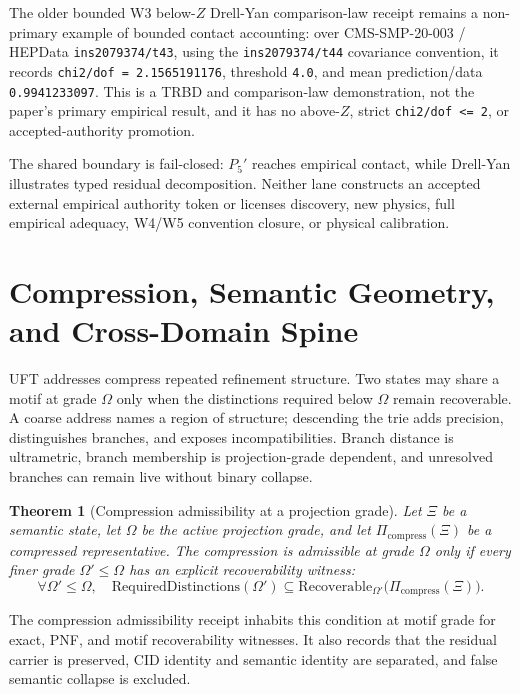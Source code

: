 \documentclass[11pt]{article}
\theoremstyle{definition}
\theoremstyle{plain}
\newtheorem{theorem}[definition]{Theorem}
\theoremstyle{remark}
\begin{document}
The older bounded W3 below-\(Z\) Drell-Yan comparison-law receipt remains a
non-primary example of bounded contact accounting: over CMS-SMP-20-003 /
HEPData \texttt{ins2079374/t43}, using the \texttt{ins2079374/t44} covariance
convention, it records \texttt{chi2/dof = 2.1565191176}, threshold
\texttt{4.0}, and mean prediction/data \texttt{0.9941233097}. This is a TRBD
and comparison-law demonstration, not the paper's primary empirical result,
and it has no above-\(Z\), strict \texttt{chi2/dof <= 2}, or accepted-authority
promotion.

The shared boundary is fail-closed: \(P_5'\) reaches empirical contact, while
Drell-Yan illustrates typed residual decomposition. Neither lane constructs an
accepted external empirical authority token or licenses discovery, new
physics, full empirical adequacy, W4/W5 convention closure, or physical
calibration.

\section{Compression, Semantic Geometry, and Cross-Domain Spine}

UFT addresses compress repeated refinement structure. Two states may share a
motif at grade \(\Omega\) only when the distinctions required below \(\Omega\)
remain recoverable. A coarse address names a region of structure; descending
the trie adds precision, distinguishes branches, and exposes incompatibilities.
Branch distance is ultrametric, branch membership is projection-grade
dependent, and unresolved branches can remain live without binary collapse.

\begin{theorem}[Compression admissibility at a projection grade]
Let \(\Xi\) be a semantic state, let \(\Omega\) be the active projection grade,
and let \(\Pi_{\mathrm{compress}}(\Xi)\) be a compressed representative. The
compression is admissible at grade \(\Omega\) only if every finer grade
\(\Omega'\leq\Omega\) has an explicit recoverability witness:
\[
\forall \Omega'\leq\Omega,\quad
\mathrm{RequiredDistinctions}(\Omega')
\subseteq
\mathrm{Recoverable}_{\Omega'}
\bigl(\Pi_{\mathrm{compress}}(\Xi)\bigr).
\]
\end{theorem}

The compression admissibility receipt inhabits this condition at motif grade
for exact, PNF, and motif recoverability witnesses. It also records that the
residual carrier is preserved, CID identity and semantic identity are
separated, and false semantic collapse is excluded.
\end{document}
